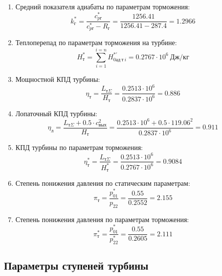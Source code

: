 \documentclass[a4paper,10pt]{article}
\begin{document}
\begin{enumerate}
        \item Средний показателя адиабаты по параметрам торможения:
        \[
            k_г^* = \frac{ c_{pг}^* }{ c_{pг}^* - R_г } =
                \frac{
                    1256.41
                }{
                    1256.41 - 287.4
                }
            = 1.2966
        \]

        \item Теплоперепад по параметрам торможения на турбине:
        \[
            H_т^* = \sum_{i=1}^{i=n}H_{0ад\ т\ i}^{*\prime} =
            0.2767 \cdot 10^6 \ Дж/кг
        \]

        \item Мощностной КПД турбины:
        \[
            \eta_т = \frac{ L_{т\Sigma} }{ H_т } =
                \frac{ 0.2513 \cdot 10^6 }{ 0.2837 \cdot 10^6 } =
            0.886
        \]

        \item Лопаточный КПД турбины:
        \[
            \eta_л = \frac{
                        L_{т\Sigma} + 0.5 \cdot c_{вых}^2
                    }{ H_т } =
            \frac{
                0.2513 \cdot 10^6 + 0.5 \cdot 119.06 ^ 2
            }{ 0.2837 \cdot 10^6 } =
            0.911
        \]

        \item КПД турбины по параметрам торможения:
        \[
            \eta_т^* = \frac{ L_{т\Sigma} }{ H_т^* } =
                \frac{ 0.2513 \cdot 10^6 }{ 0.2767 \cdot 10^6 } =
            0.9084
        \]

        \item Степень понижения давления по статическим параметрам:
        \[
            \pi_{т} = \frac{p_{01}^*}{p_{2 2}} =
            \frac{0.55}{0.2552} =
            2.155
        \]

        \item Степень понижения давления по параметрам торможения:
        \[
            \pi_{т}^* = \frac{p_{01}^*}{p_{2 2}^*} =
            \frac{0.55}{0.2605} =
            2.111
        \]

    \end{enumerate}
    

    \subsection{Параметры ступеней турбины}
    
\end{document}
